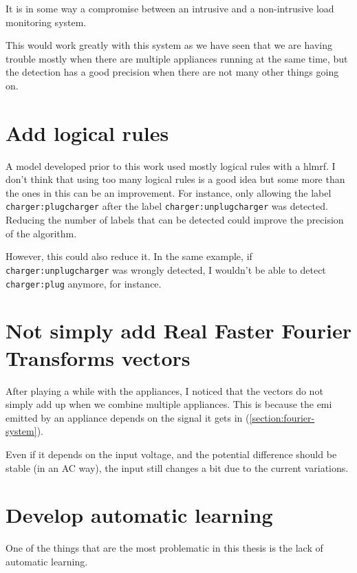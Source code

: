 It is in some way a compromise between an intrusive and a non-intrusive load monitoring system.

This would work greatly with this system as we have seen that we are having trouble mostly when there are multiple appliances running at the same time, but the detection has a good precision when there are not many other things going on.

\section{Add logical rules}
A model developed prior to this work used mostly logical rules with a \acrshort{hlmrf}. I don't think that using too many logical rules is a good idea but some more than the ones in this can be an improvement. For instance, only allowing the label \texttt{charger:plugcharger} after the label \texttt{charger:unplugcharger} was detected. Reducing the number of labels that can be detected could improve the precision of the algorithm.

However, this could also reduce it. In the same example, if \texttt{charger:unplugcharger} was wrongly detected, I wouldn't be able to detect \texttt{charger:plug} anymore, for instance. 

\section{Not simply add Real Faster Fourier Transforms vectors}
After playing a while with the appliances, I noticed that the vectors do not simply add up when we combine multiple appliances. This is because the \acrshort{emi} emitted by an appliance depends on the signal it gets in (\autoref{section:fourier-system}).

Even if it depends on the input voltage, and the potential difference should be stable (in an AC way), the input still changes a bit due to the current variations.

\section{Develop automatic learning}
One of the things that are the most problematic in this thesis is the lack of automatic learning.

